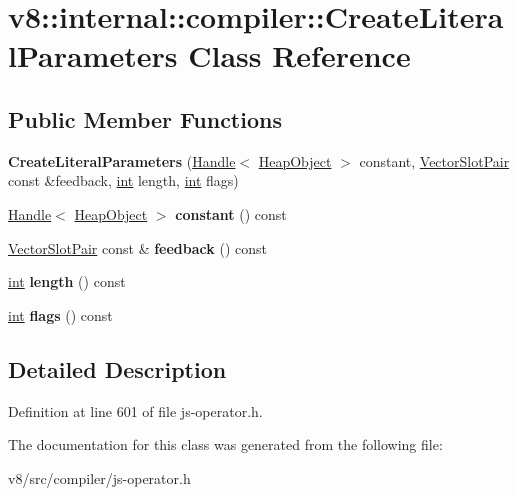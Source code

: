 \hypertarget{classv8_1_1internal_1_1compiler_1_1CreateLiteralParameters}{}\section{v8\+:\+:internal\+:\+:compiler\+:\+:Create\+Literal\+Parameters Class Reference}
\label{classv8_1_1internal_1_1compiler_1_1CreateLiteralParameters}
\subsection*{Public Member Functions}
\begin{DoxyCompactItemize}
\item 
\mbox{\label{classv8_1_1internal_1_1compiler_1_1CreateLiteralParameters_a0e4593931e65a8e940b0cfd13a6d3fc9}} 
{\bfseries Create\+Literal\+Parameters} (\mbox{\hyperlink{classv8_1_1internal_1_1Handle}{Handle}}$<$ \mbox{\hyperlink{classv8_1_1internal_1_1HeapObject}{Heap\+Object}} $>$ constant, \mbox{\hyperlink{classv8_1_1internal_1_1VectorSlotPair}{Vector\+Slot\+Pair}} const \&feedback, \mbox{\hyperlink{classint}{int}} length, \mbox{\hyperlink{classint}{int}} flags)
\item 
\mbox{\label{classv8_1_1internal_1_1compiler_1_1CreateLiteralParameters_a938ae6004144c445dfe2db571d71e028}} 
\mbox{\hyperlink{classv8_1_1internal_1_1Handle}{Handle}}$<$ \mbox{\hyperlink{classv8_1_1internal_1_1HeapObject}{Heap\+Object}} $>$ {\bfseries constant} () const
\item 
\mbox{\label{classv8_1_1internal_1_1compiler_1_1CreateLiteralParameters_a61bd488d38ebeb1f07e616532406287b}} 
\mbox{\hyperlink{classv8_1_1internal_1_1VectorSlotPair}{Vector\+Slot\+Pair}} const  \& {\bfseries feedback} () const
\item 
\mbox{\label{classv8_1_1internal_1_1compiler_1_1CreateLiteralParameters_a93f1e40efbebb4b1e39ed6e003cef403}} 
\mbox{\hyperlink{classint}{int}} {\bfseries length} () const
\item 
\mbox{\label{classv8_1_1internal_1_1compiler_1_1CreateLiteralParameters_a395b545e4fe377d03a18a545dec2fcac}} 
\mbox{\hyperlink{classint}{int}} {\bfseries flags} () const
\end{DoxyCompactItemize}


\subsection{Detailed Description}


Definition at line 601 of file js-\/operator.\+h.



The documentation for this class was generated from the following file\+:\begin{DoxyCompactItemize}
\item 
v8/src/compiler/js-\/operator.\+h\end{DoxyCompactItemize}
